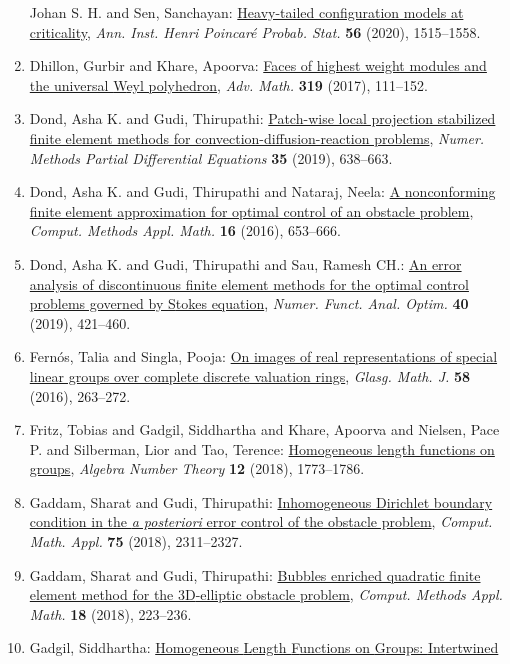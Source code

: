 \begin{enumerate}
Johan S. H. and Sen, Sanchayan: \href{https://doi.org/10.1214/19-AIHP980}{Heavy-tailed configuration models at criticality}, \emph{Ann. Inst. Henri Poincar\'{e} Probab. Stat.} {\bf 56} (2020), 1515--1558.
\item Dhillon, Gurbir and Khare, Apoorva: \href{https://doi.org/10.1016/j.aim.2017.08.005}{Faces of highest weight modules and the universal {W}eyl
polyhedron}, \emph{Adv. Math.} {\bf 319} (2017), 111--152.
\item Dond, Asha K. and Gudi, Thirupathi: \href{https://doi.org/10.1002/num.22317}{Patch-wise local projection stabilized finite element methods
for convection-diffusion-reaction problems}, \emph{Numer. Methods Partial Differential Equations} {\bf 35} (2019), 638--663.
\item Dond, Asha K. and Gudi, Thirupathi and Nataraj, Neela: \href{https://doi.org/10.1515/cmam-2016-0024}{A nonconforming finite element approximation for optimal
control of an obstacle problem}, \emph{Comput. Methods Appl. Math.} {\bf 16} (2016), 653--666.
\item Dond, Asha K. and Gudi, Thirupathi and Sau, Ramesh CH.: \href{https://doi.org/10.1080/01630563.2018.1538158}{An error analysis of discontinuous finite element methods for
the optimal control problems governed by {S}tokes equation}, \emph{Numer. Funct. Anal. Optim.} {\bf 40} (2019), 421--460.
\item Fern\'{o}s, Talia and Singla, Pooja: \href{https://doi.org/10.1017/S001708951500018X}{On images of real representations of special linear groups
over complete discrete valuation rings}, \emph{Glasg. Math. J.} {\bf 58} (2016), 263--272.
\item Fritz, Tobias and Gadgil, Siddhartha and Khare, Apoorva and Nielsen, Pace P. and Silberman, Lior and Tao, Terence: \href{https://doi.org/10.2140/ant.2018.12.1773}{Homogeneous length functions on groups}, \emph{Algebra Number Theory} {\bf 12} (2018), 1773--1786.
\item Gaddam, Sharat and Gudi, Thirupathi: \href{https://doi.org/10.1016/j.camwa.2017.12.010}{Inhomogeneous {D}irichlet boundary condition in the {\it a
posteriori} error control of the obstacle problem}, \emph{Comput. Math. Appl.} {\bf 75} (2018), 2311--2327.
\item Gaddam, Sharat and Gudi, Thirupathi: \href{https://doi.org/10.1515/cmam-2017-0018}{Bubbles enriched quadratic finite element method for the
3{D}-elliptic obstacle problem}, \emph{Comput. Methods Appl. Math.} {\bf 18} (2018), 223--236.
\item Gadgil, Siddhartha: \href{https://doi.org/10.1007/s10817-019-09523-1}{Homogeneous {L}ength {F}unctions on {G}roups: {I}ntertwined
}
\end{enumerate}

